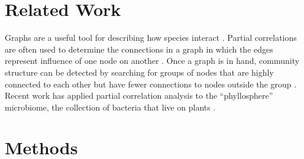 \documentclass[12pt]{article}
\begin{document}



\section{Related Work}

Graphs are a useful tool for describing how species interact \cite{borthagaray2014inferring}.
Partial correlations are often used to determine the connections in a graph in which the edges represent influence of one node on another \cite{hero2012hub}. 
Once a graph is in hand, community structure can be detected by searching for groups of nodes that are highly connected to each other but have fewer connections to nodes outside the group \cite{girvan2002community}.
Recent work has applied partial correlation analysis to the ``phyllosphere'' microbiome, the collection of bacteria that live on plants \cite{agler2016microbial}.


\section{Methods} %
\end{document}
